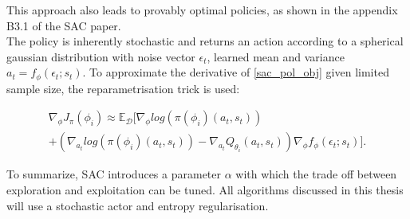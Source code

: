 This approach also leads to provably optimal policies, as shown in the appendix B3.1 of the SAC paper. \\
The policy is inherently stochastic and returns an action according to a spherical gaussian distribution with noise vector $\epsilon_t$, learned mean and variance $a_t = f_{\phi}(\epsilon_t;s_t)$. 
To approximate the derivative of \ref{sac_pol_obj} given limited sample size, the reparametrisation trick is used:

\begin{equation}
    \begin{align}
        \nabla_{\phi}J_\pi(\phi_{i}) \approx \mathbb{E}_{\mathcal{D}} [\nabla_{\phi} log (\pi(\phi_{i})(a_t, s_t))\\
        + \left( \nabla_{a_t} log (\pi(\phi_{i})(a_t, s_t)) - \nabla_{a_t} Q_{\theta_i}(a_t, s_t) \right) \nabla_{\phi} f_{\phi}(\epsilon_t;s_t)].
    \end{align}
\end{equation}



To summarize, SAC introduces a parameter $\alpha$ with which the trade off between exploration and exploitation can be tuned. All algorithms discussed in this thesis will use a stochastic 
actor and entropy regularisation.
